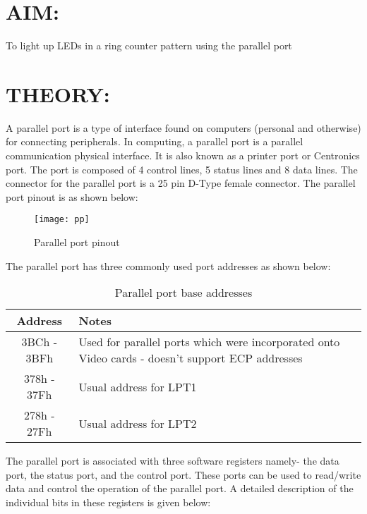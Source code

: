 
%
%
%
\section*{AIM:}
To light up LEDs in a ring counter pattern using the parallel port
\section*{THEORY:}
A parallel port is a type of interface found on computers (personal and otherwise) for connecting peripherals. In computing, a parallel port is a parallel communication physical interface. It is also known as a printer port or Centronics port. The port is composed of 4 control lines, 5 status lines and 8 data lines. The connector for the parallel port is a 25 pin D-Type female connector. The parallel port pinout is as shown below:

\begin{figure}[h]
\centering
\texttt{[image: pp]}
\caption{Parallel port pinout}
\end{figure}

The parallel port has three commonly used port addresses as shown below:

\newpage
\begin{table}[h]
\centering
\bgroup
\def\arraystretch{1.5}
\begin{tabular}{ |c|p{7cm}| }
\hline
\textbf{Address} & \textbf{Notes}\\
\hline
3BCh - 3BFh & Used for parallel ports which were incorporated onto Video cards - doesn't support ECP addresses\\
\hline
378h - 37Fh & Usual address for LPT1\\
\hline
278h - 27Fh & Usual address for LPT2\\
\hline
\end{tabular}
\caption{Parallel port base addresses}
\egroup
\end{table}

The parallel port is associated with three software registers namely- the data port, the status port, and the control port.
These ports can be used to read/write data and control the operation of the parallel port. A detailed description of the individual bits in these registers is given below:

